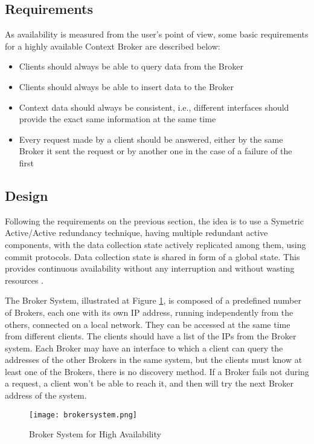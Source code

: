 \subsection{Requirements}
As availability is measured from the user's point of view, some basic requirements for a highly available Context Broker are described below:

\begin{itemize}
	\item Clients should always be able to query data from the Broker
	\item Clients should always be able to insert data to the Broker
	\item Context data should always be consistent, i.e., different interfaces should provide the exact same information at the same time
	\item Every request made by a client should be answered, either by the same Broker it sent the request or by another one in the case of a failure of the first
\end{itemize}

\subsection{Design}
Following the requirements on the previous section, the idea is to use a Symetric Active/Active redundancy technique, having multiple redundant active components, with the data collection state actively replicated among them, using commit protocols. Data collection state is shared in form of a global state. This provides continuous availability without any interruption and without wasting resources \cite{engelmann2005concepts}.

The Broker System, illustrated at Figure \ref{fig:brokersystem}, is composed of a predefined number of Brokers, each one with its own IP address, running independently from the others, connected on a local network. They can be accessed at the same time from different clients. The clients should have a list of the IPs from the Broker system. Each Broker may have an interface to which a client can query the addresses of the other Brokers in the same system, but the clients must know at least one of the Brokers, there is no discovery method. If a Broker fails not during a request, a client won't be able to reach it, and then will try the next Broker address of the system.


\begin{figure}[h]
	\centering
	\texttt{[image: brokersystem.png]}
	\caption{Broker System for High Availability}
	\label{fig:brokersystem}
	
\end{figure}



